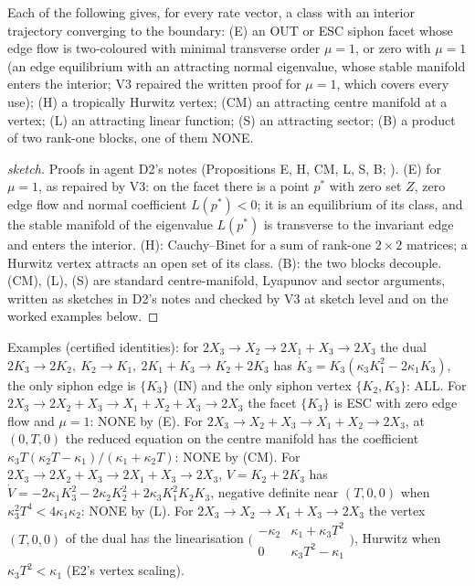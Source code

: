 \documentclass[11pt,a4paper]{report}
\begin{document}
\begin{proposition}\label{prop:none-cert}
Each of the following gives, for every rate vector, a class with an interior trajectory converging to the boundary:
(E) an OUT or ESC siphon facet whose edge flow is two-coloured with minimal transverse order \(\mu=1\), or zero with
\(\mu=1\) (an edge equilibrium with an attracting normal eigenvalue, whose stable manifold enters the interior; V3 repaired
the written proof for \(\mu=1\), which covers every use); (H) a tropically Hurwitz vertex; (CM) an attracting centre
manifold at a vertex; (L) an attracting linear function; (S) an attracting sector; (B) a product of two rank-one blocks,
one of them NONE.
\end{proposition}
\begin{proof}[sketch]
Proofs in agent D2's notes (Propositions E, H, CM, L, S, B; ). (E) for
\(\mu=1\), as repaired by V3: on the facet there is a point \(p^*\) with zero set \(Z\), zero edge flow and normal
coefficient \(L(p^*)<0\); it is an equilibrium of its class, and the stable manifold of the eigenvalue \(L(p^*)\) is
transverse to the invariant edge and enters the interior. (H): Cauchy--Binet for a sum of rank-one \(2\times2\)
matrices; a Hurwitz vertex attracts an open set of its class. (B): the two blocks decouple. (CM), (L), (S) are standard
centre-manifold, Lyapunov and sector arguments, written as sketches in D2's notes and checked by V3 at sketch level and
on the worked examples below.
\end{proof}

Examples (certified identities): for \(2X_3\to X_2\to2X_1+X_3\to2X_3\) the dual \(2K_3\to2K_2,\ K_2\to K_1,\
2K_1+K_3\to K_2+2K_3\) has \(\dot K_3=K_3(\kappa_3K_1^2-2\kappa_1K_3)\), the only siphon edge is \(\{K_3\}\) (IN) and the only
siphon vertex \(\{K_2,K_3\}\): ALL. For \(2X_3\to2X_2+X_3\to X_1+X_2+X_3\to2X_3\) the facet \(\{K_3\}\) is ESC with zero edge
flow and \(\mu=1\): NONE by (E). For \(2X_3\to X_2+X_3\to X_1+X_2\to2X_3\), at \((0,T,0)\) the reduced equation on the centre
manifold has the coefficient \(\kappa_3T(\kappa_2T-\kappa_1)/(\kappa_1+\kappa_2T)\): NONE by (CM). For
\(2X_3\to2X_2+X_3\to2X_1+X_3\to2X_3\), \(V=K_2+2K_3\) has \(\dot V=-2\kappa_1K_3^2-2\kappa_2K_2^2+2\kappa_3K_1^2K_2K_3\), negative
definite near \((T,0,0)\) when \(\kappa_3^2T^4<4\kappa_1\kappa_2\): NONE by (L). For \(2X_3\to X_2\to X_1+X_3\to2X_3\) the
vertex \((T,0,0)\) of the dual has the linearisation \(\bigl(\begin{smallmatrix}-\kappa_2&\kappa_1+\kappa_3T^2\\0&\kappa_3T^2-
\kappa_1\end{smallmatrix}\bigr)\), Hurwitz when \(\kappa_3T^2<\kappa_1\) (E2's vertex scaling).
\end{document}
